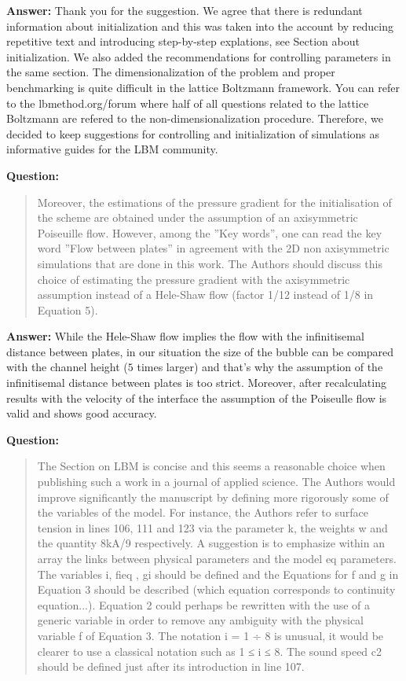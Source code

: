 \documentclass{article}
\begin{document}
\textbf{Answer:} Thank you for the suggestion. We agree that there is redundant information
about initialization and this was taken into the account by reducing repetitive text and
introducing step-by-step explations, see Section about initialization. We also added the
recommendations for controlling parameters in the same section.  The
dimensionalization of the problem and proper benchmarking is quite difficult in the lattice
Boltzmann framework. You can refer to the lbmethod.org/forum where half of all questions related to
the lattice Boltzmann are refered to the non-dimensionalization procedure. Therefore, we decided to
keep suggestions for controlling and initialization of simulations as informative guides for the
LBM community.

\textbf{Question:}
\begin{quotation}
 Moreover, the estimations of the pressure gradient for the initialisation of the scheme are
obtained
under the assumption of an axisymmetric Poiseuille ﬂow. However, among the ”Key words”, one can
read the key word ”Flow between plates” in agreement with the 2D non axisymmetric simulations
that are done in this work. The Authors should discuss this choice of estimating the pressure
gradient with the axisymmetric assumption instead of a Hele-Shaw flow (factor 1/12 instead of 1/8
in Equation 5).
\end{quotation}

\textbf{Answer:} While the Hele-Shaw flow implies the flow with the infinitisemal distance between
plates, in our situation the size of the bubble can be compared with the channel height ($5$ times
larger) and that's why the assumption of the infinitisemal distance between plates is too strict.
Moreover, after recalculating results with the velocity of the interface the assumption of the
Poiseulle flow is valid and shows good accuracy.

\textbf{Question:}
\begin{quotation}
The Section on LBM is concise and this seems a reasonable choice when publishing such a work in a
journal of applied science. The Authors would improve signiﬁcantly the manuscript by deﬁning more
rigorously some of the variables of the model. For instance, the Authors refer to surface tension in
lines 106, 111 and 123 via the parameter k, the weights w and the quantity 8kA/9 respectively.
A suggestion is to emphasize within an array the links between physical parameters and the model
eq
parameters. The variables i, fieq , gi should be deﬁned and the Equations for f and g in Equation
3 should be described (which equation corresponds to continuity equation...). Equation 2 could
perhaps be rewritten with the use of a generic variable in order to remove any ambiguity with the
physical variable f of Equation 3. The notation i = 1 ÷ 8 is unusual, it would be clearer to use a
classical notation such as 1 ≤ i ≤ 8. The sound speed c2 should be deﬁned just after its
introduction in line 107.
\end{quotation}
\end{document}
